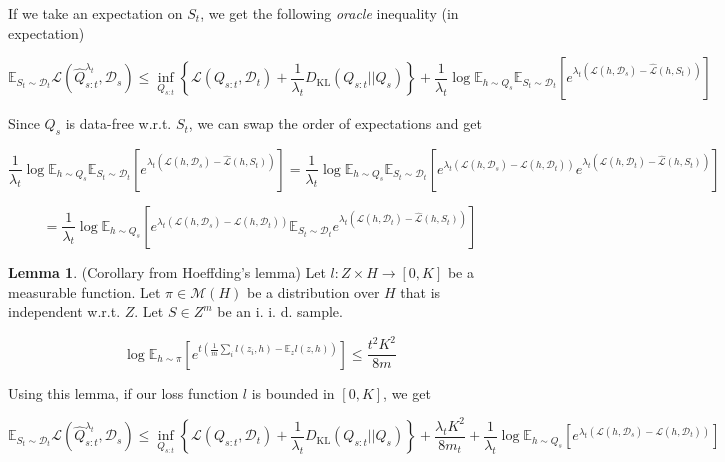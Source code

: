 \documentclass[letterpaper]{article}
\theoremstyle{definition}
\newtheorem{lemma}{Lemma}[section]
\begin{document}
If we take an expectation on $S_t$, we get the following \emph{oracle} inequality (in expectation)

$$\mathbb{E}_{S_t\sim \mathcal{D}_t}\mathcal{L}( \hat{Q}^{\lambda_t}_{s:t},\mathcal{D}_s)\leq \inf_{Q_{s:t}}\left \{ \mathcal{L}(Q_{s:t},\mathcal{D}_t) + \frac{1}{\lambda_t}D_{\mathrm{KL}}(Q_{s:t}||Q_{s}) \right \}+\frac{1}{\lambda_t}\log\mathbb{E}_{h\sim Q_s}\mathbb{E}_{S_t\sim \mathcal{D}_t}\left [e^{\lambda_t(\mathcal{L}(h,\mathcal{D}_s)-\hat{\mathcal{L}}(h,S_t))} \right ]$$

Since $Q_s$ is data-free w.r.t. $S_t$, we can swap the order of expectations and get

$$\frac{1}{\lambda_t}\log\mathbb{E}_{h\sim Q_s}\mathbb{E}_{S_t\sim \mathcal{D}_t}\left [e^{\lambda_t(\mathcal{L}(h,\mathcal{D}_s)-\hat{\mathcal{L}}(h,S_t))} \right ]=\frac{1}{\lambda_t}\log\mathbb{E}_{h\sim Q_s}\mathbb{E}_{S_t\sim \mathcal{D}_t}\left [e^{\lambda_t(\mathcal{L}(h,\mathcal{D}_s)-\mathcal{L}(h,\mathcal{D}_t))}e^{\lambda_t(\mathcal{L}(h,\mathcal{D}_t)-\hat{\mathcal{L}}(h,S_t))} \right ]$$

$$=\frac{1}{\lambda_t}\log\mathbb{E}_{h\sim Q_s}\left [e^{\lambda_t(\mathcal{L}(h,\mathcal{D}_s)-\mathcal{L}(h,\mathcal{D}_t))}\mathbb{E}_{S_t\sim \mathcal{D}_t}e^{\lambda_t(\mathcal{L}(h,\mathcal{D}_t)-\hat{\mathcal{L}}(h,S_t))} \right ]$$

\begin{lemma} (Corollary from Hoeffding's lemma) 
	Let $l:Z\times H\rightarrow[0,K]$ be a measurable function. Let $\pi\in\mathcal{M}(H)$ be a distribution over $H$ that is independent w.r.t. $Z$. Let $S\in Z^m$ be an i.\! i.\! d.\! sample. 
	
	$$\log \mathbb{E}_{h\sim \pi}\left [e^{t(\frac{1}{m}\sum_i l(z_i,h)-\mathbb{E}_{z}l(z,h))}\right ]\leq \frac{t^2K^2}{8m}$$
\end{lemma}

Using this lemma, if our loss function $l$ is bounded in $[0,K]$, we get

\begin{equation} \label{eq:oracle-base}
\mathbb{E}_{S_t\sim \mathcal{D}_t}\mathcal{L}( \hat{Q}^{\lambda_t}_{s:t},\mathcal{D}_s)\leq \inf_{Q_{s:t}}\left \{ \mathcal{L}(Q_{s:t},\mathcal{D}_t) + \frac{1}{\lambda_t}D_{\mathrm{KL}}(Q_{s:t}||Q_{s}) \right \}+\frac{\lambda_t K^2}{8m_t}+\frac{1}{\lambda_t}\log\mathbb{E}_{h\sim Q_s}\left [e^{\lambda_t(\mathcal{L}(h,\mathcal{D}_s)-\mathcal{L}(h,\mathcal{D}_t))} \right ]
\end{equation}
\end{document}
